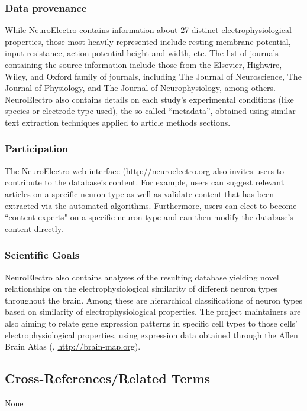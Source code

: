 \documentclass[12pt]{article}
\begin{document}
\subsubsection*{Data provenance}
While NeuroElectro contains information about 27 distinct electrophysiological properties, those most heavily represented include resting membrane potential, input resistance, action potential height and width, etc.
The list of journals containing the source information include those from the Elsevier, Highwire, Wiley, and Oxford family of journals, including The Journal of Neuroscience, The Journal of Physiology, and The Journal of Neurophysiology, among others.
NeuroElectro also contains details on each study’s experimental conditions (like species or electrode type used), the so-called ``metadata'', obtained using similar text extraction techniques applied to article methods sections.

\subsubsection*{Participation}
The NeuroElectro web interface (\url{http://neuroelectro.org} also invites users to contribute to the database’s content.
For example, users can suggest relevant articles on a specific neuron type as well as validate content that has been extracted via the automated algorithms.
Furthermore, users can elect to become ``content-experts" on a specific neuron type and can then modify the database’s content directly.

\subsubsection*{Scientific Goals}
NeuroElectro also contains analyses of the resulting database yielding novel relationships on the electrophysiological similarity of different neuron types throughout the brain.
Among these are hierarchical classifications of neuron types based on similarity of electrophysiological properties.
The project maintainers are also aiming to relate gene expression patterns in specific cell types to those cells' electrophysiological properties, using expression data obtained through the Allen Brain Atlas (\cite{lein_genome-wide_2007}, \url{http://brain-map.org}).

\subsection*{Cross-References/Related Terms}
None



\end{document}
